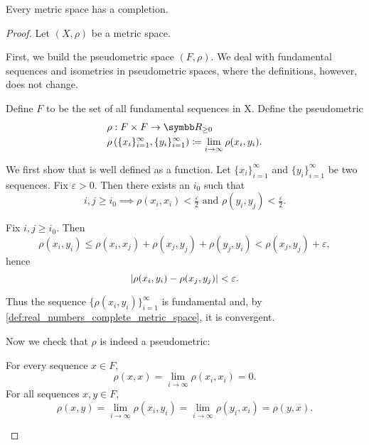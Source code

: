 \begin{theorem}\label{thm:metric_space_completion_existence}
  Every metric space has a completion.
\end{theorem}
\begin{proof}
  Let \( (X, \rho) \) be a metric space.

  \begin{defenum}
     First, we build the pseudometric space \( (F, \rho) \). We deal with fundamental sequences and isometries in pseudometric spaces, where the definitions, however, does not change.

     Define \( F \) to be the set of all fundamental sequences in X. Define the pseudometric
    \begin{align*}
      &\rho: F \times F \to \BR_{\geq 0} \\
      &\rho\left( \{ x_i \}_{i=1}^\infty, \{ y_i \}_{i=1}^\infty \right) \coloneqq \lim_{i \to \infty} \rho(x_i, y_i).
    \end{align*}

    We first show that is well defined as a function. Let \( \{ x_i \}_{i=1}^\infty \) and \( \{ y_i \}_{i=1}^\infty \) be two sequences. Fix \( \varepsilon > 0 \). Then there exists an \( i_0 \) such that
    \begin{equation*}
      i, j \geq i_0 \implies \rho(x_i, x_i) < \tfrac \varepsilon 2 \text{ and } \rho(y_i, y_j) < \tfrac \varepsilon 2.
    \end{equation*}

    Fix \( i, j \geq i_0 \). Then
    \begin{equation*}
      \rho(x_i, y_i) \leq \rho(x_i, x_j) + \rho(x_j, y_j) + \rho(y_j, y_i) < \rho(x_j, y_j) + \varepsilon,
    \end{equation*}
    hence
    \begin{equation*}
      \left\vert \rho(x_i, y_i) - \rho(x_j, y_j) \right\vert < \varepsilon.
    \end{equation*}

    Thus the sequence \( \{ \rho(x_i, y_i) \}_{i=1}^\infty \) is fundamental and, by \cref{def:real_numbers_complete_metric_space}, it is convergent.

    Now we check that \( \rho \) is indeed a pseudometric:
    \begin{description}
       For every sequence \( x \in F \),
      \begin{equation*}
        \rho(x, x) = \lim_{i \to \infty} \rho(x_i, x_i) = 0.
      \end{equation*}
       For all sequences \( x, y \in F \),
      \begin{equation*}
        \rho(x, y) = \lim_{i \to \infty} \rho(x_i, y_i) = \lim_{i \to \infty} \rho(y_i, x_i) = \rho(y, x).
      \end{equation*}


\end{description}
\end{defenum}
\end{proof}
